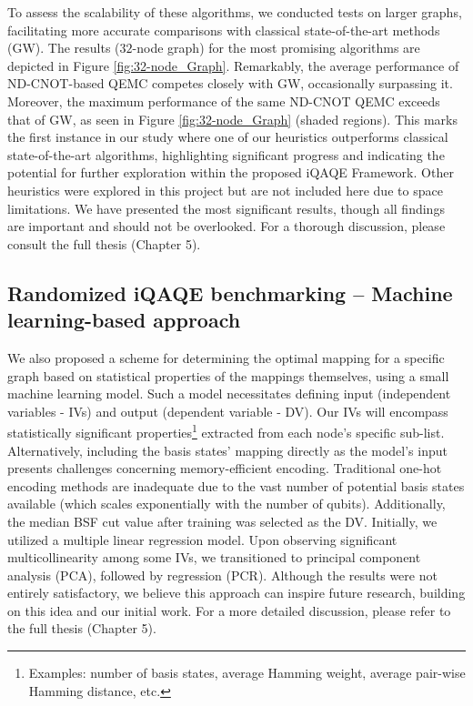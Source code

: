 To assess the scalability of these algorithms, we conducted tests on larger graphs, facilitating more accurate comparisons with classical state-of-the-art methods (GW). The results ($32$-node graph) for the most promising algorithms are depicted in Figure \ref{fig:32-node_Graph}. Remarkably, the average performance of ND-CNOT-based QEMC competes closely with GW, occasionally surpassing it. Moreover, the maximum performance of the same ND-CNOT QEMC exceeds that of GW, as seen in Figure \ref{fig:32-node_Graph} (shaded regions). This marks the first instance in our study where one of our heuristics outperforms classical state-of-the-art algorithms, highlighting significant progress and indicating the potential for further exploration within the proposed iQAQE Framework. Other heuristics were explored in this project but are not included here due to space limitations. We have presented the most significant results, though all findings are important and should not be overlooked. For a thorough discussion, please consult the full thesis (Chapter 5).

\subsection{Randomized iQAQE benchmarking -- Machine learning-based approach}
\label{subsection:Randomized_iQAQE_ML}
We also proposed a scheme for determining the optimal mapping for a specific graph based on statistical properties of the mappings themselves, using a small machine learning model. Such a model necessitates defining input (independent variables - IVs) and output (dependent variable - DV). Our IVs will encompass statistically significant properties\footnote{Examples: number of basis states, average Hamming weight, average pair-wise Hamming distance, etc.} extracted from each node's specific sub-list. Alternatively, including the basis states' mapping directly as the model's input presents challenges concerning memory-efficient encoding. Traditional one-hot encoding methods are inadequate due to the vast number of potential basis states available (which scales exponentially with the number of qubits). Additionally, the median BSF cut value after training was selected as the DV. Initially, we utilized a multiple linear regression model. Upon observing significant multicollinearity among some IVs, we transitioned to principal component analysis (PCA), followed by regression (PCR). Although the results were not entirely satisfactory, we believe this approach can inspire future research, building on this idea and our initial work. For a more detailed discussion, please refer to the full thesis (Chapter 5).